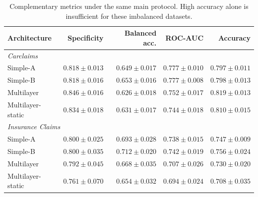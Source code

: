 \begin{table}[!htbp]\centering\footnotesize
\caption{Complementary metrics under the same main protocol. High accuracy alone is insufficient for these imbalanced datasets.}\label{tab:architectures_aux}
\setlength{\tabcolsep}{2pt}
\begin{tabular}{lrrrr}\toprule
Architecture & Specificity & Balanced acc. & ROC-AUC & Accuracy\\\midrule
\multicolumn{5}{l}{\textit{Carclaims}}\\
Simple-A & $0.818 \pm 0.013$ & $0.649 \pm 0.017$ & $0.777 \pm 0.010$ & $0.797 \pm 0.011$\\
Simple-B & $0.818 \pm 0.016$ & $0.653 \pm 0.016$ & $0.777 \pm 0.008$ & $0.798 \pm 0.013$\\
Multilayer & $0.846 \pm 0.016$ & $0.626 \pm 0.018$ & $0.752 \pm 0.017$ & $0.819 \pm 0.013$\\
Multilayer-static & $0.834 \pm 0.018$ & $0.631 \pm 0.017$ & $0.744 \pm 0.018$ & $0.810 \pm 0.015$\\
\multicolumn{5}{l}{\textit{Insurance Claims}}\\
Simple-A & $0.800 \pm 0.025$ & $0.693 \pm 0.028$ & $0.738 \pm 0.015$ & $0.747 \pm 0.009$\\
Simple-B & $0.800 \pm 0.035$ & $0.712 \pm 0.020$ & $0.742 \pm 0.019$ & $0.756 \pm 0.024$\\
Multilayer & $0.792 \pm 0.045$ & $0.668 \pm 0.035$ & $0.707 \pm 0.026$ & $0.730 \pm 0.020$\\
Multilayer-static & $0.761 \pm 0.070$ & $0.654 \pm 0.032$ & $0.694 \pm 0.024$ & $0.708 \pm 0.035$\\
\bottomrule\end{tabular}
\end{table}
